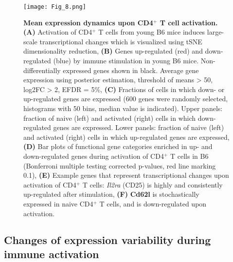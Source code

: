 \begin{figure}[!ht]
\centering
\texttt{[image: Fig\_8.png]}
\caption[Mean expression dynamics upon CD4$^+$ T cell activation]{\textbf{Mean expression dynamics upon CD4$^+$ T cell activation.}\\
\textbf{(A)} Activation of CD4$^+$ T cells from young B6 mice induces large-scale transcriptional changes which is visualized using tSNE dimensionality reduction, \textbf{(B)} Genes up-regulated (red) and down-regulated (blue) by immune stimulation in young B6 mice. Non-differentially expressed genes shown in black. Average gene expression using posterior estimation, threshold of means > 50, log2FC > 2, EFDR = 5\%, \textbf{(C)} Fractions of cells in which down- or up-regulated genes are expressed (600 genes were randomly selected, histograms with 50 bins, median value is indicated). Upper panels: fraction of naive (left) and activated (right) cells in which down-regulated genes are expressed. Lower panels: fraction of naive (left) and activated (right) cells in which up-regulated genes are expressed, \textbf{(D)} Bar plots of functional gene categories enriched in up- and down-regulated genes during activation of CD4$^+$ T cells in B6 (Bonferroni multiple testing corrected p-values, red line marking 0.1), \textbf{(E)} Example genes that represent transcriptional changes upon activation of CD4$^+$ T cells: \textit{Il2ra} (CD25) is highly and consistently up-regulated after stimulation, \textbf{(F)} \textbf{Cd62l} is stochastically expressed in naive CD4$^+$ T cells, and is down-regulated upon activation.
}
\label{fig1:immune_activation}
\end{figure}

\newpage

\subsection{Changes of expression variability during immune activation}

